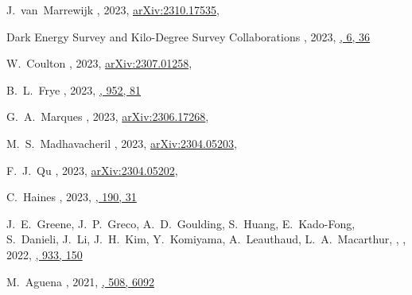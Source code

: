 \item
J.~van~Marrewijk 
,
2023, \href{https://ui.adsabs.harvard.edu/abs/2023arXiv231006120V/abstract}{arXiv:2310.17535},
\submitted{\aap}

\item
Dark Energy Survey and Kilo-Degree Survey Collaborations 
,
2023, \href{https://ui.adsabs.harvard.edu/abs/2023OJAp....6E..36A/abstract}{\oja, 6, 36}

\item
W.~Coulton 
,
2023, \href{https://ui.adsabs.harvard.edu/abs/2023arXiv230701258C/abstract}{arXiv:2307.01258},
\submitted{\prd}

\item
B.~L.~Frye 
,
2023, \href{https://ui.adsabs.harvard.edu/abs/2023ApJ...952...81F/abstract}{\apj, 952, 81}

\item
G.~A.~Marques 
,
2023, \href{https://ui.adsabs.harvard.edu/abs/2023arXiv230617268M/abstract}{arXiv:2306.17268},
\accepted{\jcap}

\item
M.~S.~Madhavacheril 
,
2023, \href{https://ui.adsabs.harvard.edu/abs/2023arXiv230405203M/abstract}{arXiv:2304.05203},
\accepted{\apj}

\item
F.~J.~Qu 
,
2023, \href{https://ui.adsabs.harvard.edu/abs/2023arXiv230405202Q/abstract}{arXiv:2304.05202},
\accepted{\apj}

\item
C.~Haines 
,
2023, \href{https://ui.adsabs.harvard.edu/abs/2023Msngr.190...31H/abstract}{\msngr, 190, 31}

\item
J.~E.~Greene, J.~P.~Greco, A.~D.~Goulding, S.~Huang, E.~Kado-Fong, S.~Danieli, J.~Li, J.~H.~Kim, Y.~Komiyama, A.~Leauthaud, L.~A.~Macarthur, \myself,
,
2022, \href{https://ui.adsabs.harvard.edu/abs/2022ApJ...933..150G/abstract}{\apj, 933, 150}

\item
M.~Aguena 
,
2021, \href{https://ui.adsabs.harvard.edu/abs/2021MNRAS.508.6092A/abstract}{\mnras, 508, 6092}


